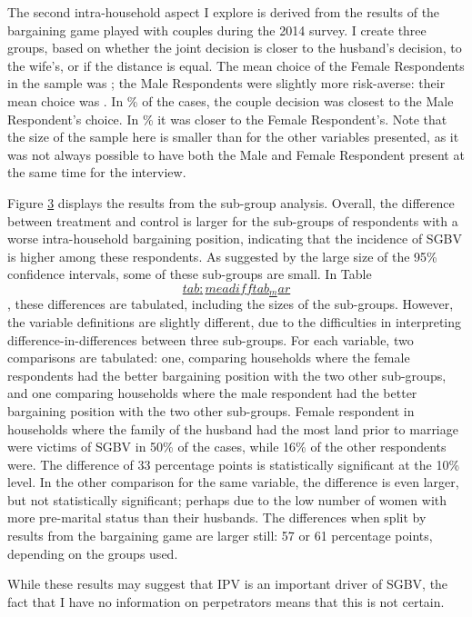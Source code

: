 \documentclass[
]{article}
\begin{document}
The second intra-household aspect I explore is derived from the results
of the bargaining game played with couples during the 2014 survey. I
create three groups, based on whether the joint decision is closer to
the husband's decision, to the wife's, or if the distance is equal. The
mean choice of the Female Respondents in the sample was ; the Male
Respondents were slightly more risk-averse: their mean choice was . In
\% of the cases, the couple decision was closest to the Male
Respondent's choice. In \% it was closer to the Female Respondent's.
Note that the size of the sample here is smaller than for the other
variables presented, as it was not always possible to have both the Male
and Female Respondent present at the same time for the interview.

Figure \hyperref[fig:meancompare_mar]{3} displays the results from the
sub-group analysis. Overall, the difference between treatment and
control is larger for the sub-groups of respondents with a worse
intra-household bargaining position, indicating that the incidence of
SGBV is higher among these respondents. As suggested by the large size
of the 95\% confidence intervals, some of these sub-groups are small. In
Table \hyperref[tab:meadifftab_mar]{\[tab:meadifftab_mar\]}, these
differences are tabulated, including the sizes of the sub-groups.
However, the variable definitions are slightly different, due to the
difficulties in interpreting difference-in-differences between three
sub-groups. For each variable, two comparisons are tabulated: one,
comparing households where the female respondents had the better
bargaining position with the two other sub-groups, and one comparing
households where the male respondent had the better bargaining position
with the two other sub-groups. Female respondent in households where the
family of the husband had the most land prior to marriage were victims
of SGBV in 50\% of the cases, while 16\% of the other respondents were.
The difference of 33 percentage points is statistically significant at
the 10\% level. In the other comparison for the same variable, the
difference is even larger, but not statistically significant; perhaps
due to the low number of women with more pre-marital status than their
husbands. The differences when split by results from the bargaining game
are larger still: 57 or 61 percentage points, depending on the groups
used.

While these results may suggest that IPV is an important driver of SGBV,
the fact that I have no information on perpetrators means that this is
not certain.
\end{document}
